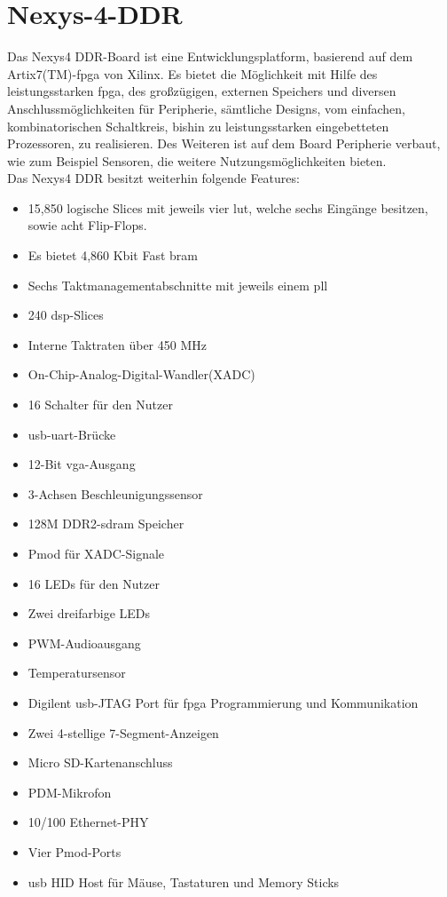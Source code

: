 \section{Nexys-4-DDR}\label{kap:nexys4}
Das Nexys4 DDR-Board ist eine Entwicklungsplatform, basierend auf dem Artix7(TM)-\ac{fpga}
von Xilinx. Es bietet die Möglichkeit mit Hilfe des leistungsstarken \ac{fpga}, des großzügigen, externen Speichers und diversen Anschlussmöglichkeiten
für Peripherie, sämtliche Designs, vom einfachen, kombinatorischen Schaltkreis, bishin zu leistungsstarken eingebetteten Prozessoren, zu realisieren.
Des Weiteren ist auf dem Board Peripherie verbaut, wie zum Beispiel Sensoren, die weitere Nutzungsmöglichkeiten bieten.\\
Das Nexys4 DDR besitzt weiterhin folgende Features:~\cite{digilent}\\
\begin{itemize}
  \item 15,850 logische Slices mit jeweils vier \ac{lut}, welche sechs Eingänge besitzen, sowie acht Flip-Flops.
  \item Es bietet 4,860 Kbit Fast \ac{bram}
  \item Sechs Taktmanagementabschnitte mit jeweils einem \ac{pll}
  \item 240 \ac{dsp}-Slices
  \item Interne Taktraten über 450 MHz
  \item On-Chip-Analog-Digital-Wandler(XADC)
  \item 16 Schalter für den Nutzer
  \item \ac{usb}-\ac{uart}-Brücke
  \item 12-Bit \ac{vga}-Ausgang
  \item 3-Achsen Beschleunigungssensor
  \item 128M DDR2-\ac{sdram} Speicher
  \item Pmod für XADC-Signale
  \item 16 LEDs für den Nutzer
  \item Zwei dreifarbige LEDs
  \item PWM-Audioausgang
  \item Temperatursensor
  \item Digilent \ac{usb}-JTAG Port für \ac{fpga} Programmierung und Kommunikation
  \item Zwei 4-stellige 7-Segment-Anzeigen
  \item Micro SD-Kartenanschluss
  \item PDM-Mikrofon
  \item 10/100 Ethernet-PHY
  \item Vier Pmod-Ports
  \item \ac{usb} HID Host für Mäuse, Tastaturen und Memory Sticks
\end{itemize}



